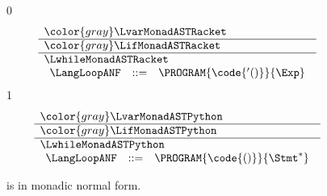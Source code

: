 \documentclass[7x10]{TimesAPriori_MIT}%
\newcommand{\gray}[1]{{\color{gray} #1}}
\def\racketEd{0}
\def\pythonEd{1}
\def\edition{1}
\newcommand{\pythonColor}[0]{}
\numberwithin{theorem}{chapter}
\numberwithin{definition}{chapter}
\numberwithin{equation}{chapter}
\begin{document}
\begin{figure}[tp]
  \centering
\begin{tcolorbox}[colback=white]  
\small
{\if\edition\racketEd    
\[
\begin{array}{l}
  \gray{\LvarMonadASTRacket} \\ \hline
  \gray{\LifMonadASTRacket} \\ \hline
  \LwhileMonadASTRacket \\ 
\begin{array}{rcl}
\LangLoopANF  &::=& \PROGRAM{\code{'()}}{\Exp}
\end{array}
\end{array}
\]
\fi}
{\if\edition\pythonEd\pythonColor
\[
\begin{array}{l}
  \gray{\LvarMonadASTPython} \\ \hline
  \gray{\LifMonadASTPython} \\ \hline
  \LwhileMonadASTPython \\
   \begin{array}{rcl}
     \LangLoopANF  &::=& \PROGRAM{\code{()}}{\Stmt^{*}}
   \end{array}
\end{array}
\]
\fi}
\end{tcolorbox}

\caption{\LangLoopANF{} is \LangLoop{} in monadic normal form.}
\label{fig:Lwhile-anf-syntax}
\end{figure}
\end{document}
